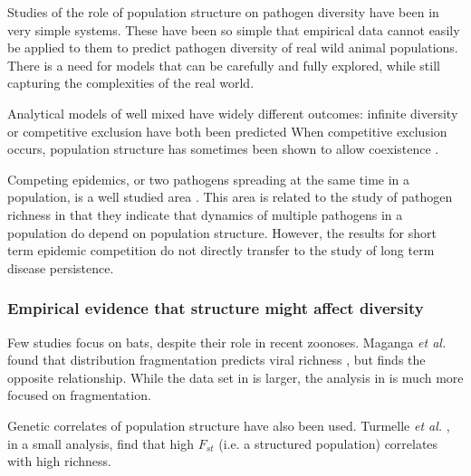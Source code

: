 
Studies of the role of population structure on pathogen diversity have been in very simple systems.
These have been so simple that empirical data cannot easily be applied to them to predict pathogen diversity of real wild animal populations.
There is a need for models that can be carefully and fully explored, while still capturing the complexities of the real world.

Analytical models of well mixed have widely different outcomes: infinite diversity \cite{may1994superinfection, ackleh2014robust} or competitive exclusion have both been predicted \cite{ackleh2003competitive,bremermann1989competitive,martcheva2013competitive,qiu2013vector,allen2004sis}
When competitive exclusion occurs, population structure has sometimes been shown to allow coexistence \cite{qiu2013vector,allen2004sis, nunes2006localized}.

Competing epidemics, or two pathogens spreading at the same time in a population, is a well studied area \cite{poletto2013host, poletto2015characterising, karrer2011competing}. 
This area is related to the study of pathogen richness in that they indicate that dynamics of multiple pathogens in a population do depend on population structure.
However, the results for short term epidemic competition do not directly transfer to the study of long term disease persistence.




\subsubsection{Empirical evidence that structure might affect diversity}




Few studies focus on bats, despite their role in recent zoonoses.
Maganga \emph{et al.} found that distribution fragmentation predicts viral richness \cite{maganga2014bat}, but \cite{gay2014parasite} finds the opposite relationship. 
While the data set in \cite{gay2014parasite} is larger, the analysis in \cite{maganga2014bat} is much more focused on fragmentation.

Genetic correlates of population structure have also been used.
Turmelle \emph{et al.} \cite{turmelle2009correlates}, in a small analysis, find that high $F_{st}$ (i.e. a structured population) correlates with high richness.



